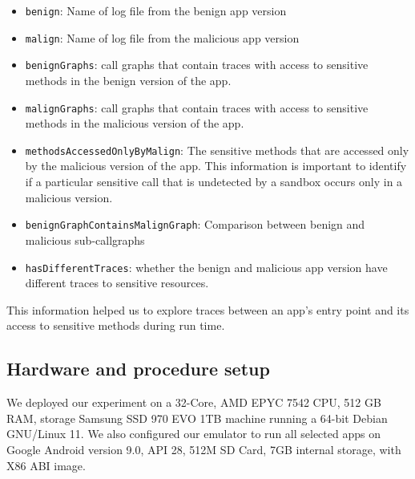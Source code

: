 \begin{itemize}
\item \texttt{benign}: Name of log file from the benign app version
\item \texttt{malign}: Name of log file from the malicious app version
\item \texttt{benignGraphs}: call graphs that contain traces with access to sensitive methods in the benign version of the app.
\item \texttt{malignGraphs}: call graphs that contain traces with access to sensitive methods in the malicious version of the app.
\item \texttt{methodsAccessedOnlyByMalign}: The sensitive methods that are accessed only by the malicious version of the app. This information is important to identify if a particular sensitive call that is undetected by a sandbox occurs only in a malicious version.
\item \texttt{benignGraphContainsMalignGraph}: Comparison between benign and malicious sub-callgraphs
\item \texttt{hasDifferentTraces}: whether the benign and malicious app version have different traces to sensitive resources. 
\end{itemize}

 This information helped us to explore traces between an app's entry point and its access to sensitive methods during run time.

\subsection{Hardware and procedure setup}\label{sec:hardware}

We deployed our experiment on a 32-Core, AMD EPYC 7542 CPU, 512 GB RAM, storage Samsung SSD 970 EVO 1TB machine running a 64-bit Debian  GNU/Linux 11. We also configured our emulator to run all selected apps on Google Android version 9.0, API 28, 512M SD Card, 7GB internal storage, with X86 ABI image.

